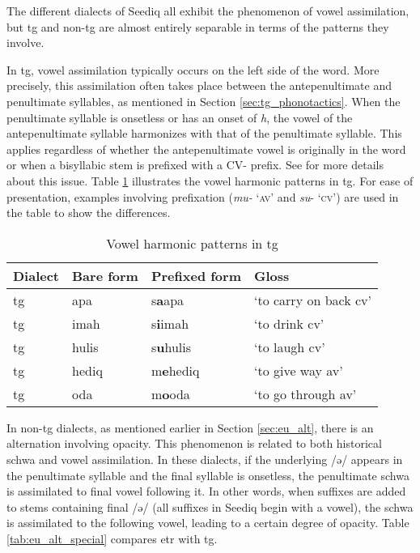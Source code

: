 The different dialects of Seediq all exhibit the phenomenon of vowel assimilation, but \acl{tg} and non-\acl{tg} are almost entirely separable in terms of the patterns they involve. 

In \acl{tg}, vowel assimilation typically occurs on the left side of the word. More precisely, this assimilation often takes place between the antepenultimate and penultimate syllables, as mentioned in Section \ref{sec:tg_phonotactics}. When the penultimate syllable is onsetless or has an onset of \textit{h}, the vowel of the antepenultimate syllable harmonizes with that of the penultimate syllable. This applies regardless of whether the antepenultimate vowel is originally in the word or when a bisyllabic stem is prefixed with a CV- prefix. See \textcite[666-673]{yang1976sedpho} for more details about this issue. Table \ref{tab:tg_vassim} illustrates the vowel harmonic patterns in \acl{tg}. For ease of presentation, examples involving prefixation (\textit{mu-} `\textsc{av}' and \textit{su}- `\textsc{cv}') are used in the table to show the differences.

\begin{table}[!htbp]
\centering
\caption{Vowel harmonic patterns in \acl{tg}}
\label{tab:tg_vassim}
\begin{tabular}{llll}
\hline
Dialect  & Bare form & Prefixed form & Gloss                       \\ \hline
\acl{tg} & apa       & s\textbf{a}apa         & `to carry on back \acs{cv}' \\
\acl{tg} & imah      & s\textbf{i}imah        & `to drink \acs{cv}'         \\
\acl{tg} & hulis     & s\textbf{u}hulis       & `to laugh \acs{cv}'         \\
\acl{tg} & hediq     & m\textbf{e}hediq       & `to give way \acs{av}'      \\
\acl{tg} & oda       & m\textbf{o}oda         & `to go through \acs{av}'          \\ \hline
\end{tabular}
\end{table}

In non-\acl{tg} dialects, as mentioned earlier in Section \ref{sec:eu_alt}, there is an alternation involving opacity. This phenomenon is related to both historical schwa and vowel assimilation. In these dialects, if the underlying /ə/ appears in the penultimate syllable and the final syllable is onsetless, the penultimate schwa is assimilated to final vowel following it. In other words, when suffixes are added to stems containing final /ə/ (all suffixes in Seediq begin with a vowel), the schwa is assimilated to the following vowel, leading to a certain degree of opacity. Table \ref{tab:eu_alt_special} compares \acl{etr} with \acl{tg}.

